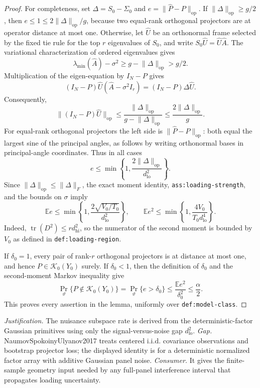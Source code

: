 \documentclass{article}
\begin{document}
\begin{proof}
For completeness, set \(\Delta=S_0-\Sigma_0\) and \(e=\lVert\widehat P-P\rVert_{\mathrm{op}}\).  If \(\lVert\Delta\rVert_{\mathrm{op}}\ge g/2\), then \(e\le1\le2\lVert\Delta\rVert_{\mathrm{op}}/g\), because two equal-rank orthogonal projectors are at operator distance at most one.  Otherwise, let \(\widehat U\) be an orthonormal frame selected by the fixed tie rule for the top \(r\) eigenvalues of \(S_0\), and write \(S_0\widehat U=\widehat U\widehat A\).  The variational characterization of ordered eigenvalues gives
\[
 \lambda_{\min}(\widehat A)-\sigma^2
 \ge g-\lVert\Delta\rVert_{\mathrm{op}}>g/2.
\]
Multiplication of the eigen-equation by \(I_N-P\) gives
\[
 (I_N-P)\widehat U(\widehat A-\sigma^2I_r)
 =(I_N-P)\Delta\widehat U.
\]
Consequently,
\[
 \lVert(I_N-P)\widehat U\rVert_{\mathrm{op}}
 \le\frac{\lVert\Delta\rVert_{\mathrm{op}}}
          {g-\lVert\Delta\rVert_{\mathrm{op}}}
 \le\frac{2\lVert\Delta\rVert_{\mathrm{op}}}{g}.
\]
For equal-rank orthogonal projectors the left side is \(\lVert\widehat P-P\rVert_{\mathrm{op}}\): both equal the largest sine of the principal angles, as follows by writing orthonormal bases in principal-angle coordinates.  Thus in all cases
\[
 e\le\min\left\{1,\frac{2\lVert\Delta\rVert_{\mathrm{op}}}{d_{\mathrm{lo}}^2}\right\}.
\]
Since \(\lVert\Delta\rVert_{\mathrm{op}}\le\lVert\Delta\rVert_F\), the exact moment identity, \texttt{ass:loading-strength}, and the bounds on \(\sigma\) imply
\[
 \mathbb E e\le\min\left\{1,\frac{2\sqrt{V_0/T_0}}{d_{\mathrm{lo}}^2}\right\},
 \qquad
 \mathbb E e^2\le\min\left\{1,\frac{4V_0}{T_0d_{\mathrm{lo}}^4}\right\}.
\]
Indeed, \(\operatorname{tr}(D^2)\le rd_{\mathrm{hi}}^2\), so the numerator of the second moment is bounded by \(V_0\) as defined in \texttt{def:loading-region}.

If \(\delta_0=1\), every pair of rank-\(r\) orthogonal projectors is at distance at most one, and hence \(P\in\mathcal K_0(Y_0)\) surely.  If \(\delta_0<1\), then the definition of \(\delta_0\) and the second-moment Markov inequality give
\[
 \Pr_\vartheta\{P\notin\mathcal K_0(Y_0)\}
 =\Pr_\vartheta\{e>\delta_0\}
 \le\frac{\mathbb Ee^2}{\delta_0^2}
 \le\frac\alpha2.
\]
This proves every assertion in the lemma, uniformly over \texttt{def:model-class}.
\end{proof}
\par\smallskip\noindent \textit{Justification.} The nuisance subspace rate is derived from the deterministic-factor Gaussian primitives using only the signal-versus-noise gap \(d_{\mathrm{lo}}^2\). \textit{Gap.} NaumovSpokoinyUlyanov2017 treats centered i.i.d. covariance observations and bootstrap projector loss; the displayed identity is for a deterministic normalized factor array with additive Gaussian panel noise. \textit{Consumer.} It gives the finite-sample geometry input needed by any full-panel interference interval that propagates loading uncertainty.
\end{document}
